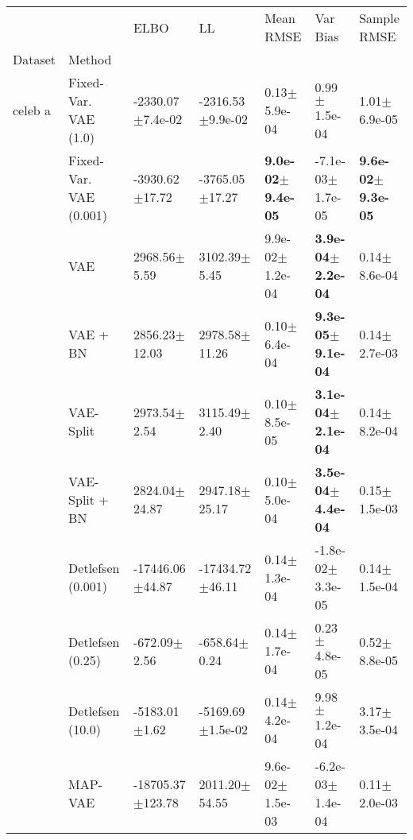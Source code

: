 \begin{tabular}{lllllll}
\toprule
      &            &                         ELBO &                           LL &                     Mean RMSE &                       Var Bias &                   Sample RMSE \\
Dataset & Method &                              &                              &                               &                                &                               \\
\midrule
celeb a & Fixed-Var. VAE (1.0) &         -2330.07$\pm$7.4e-02 &         -2316.53$\pm$9.9e-02 &              0.13$\pm$5.9e-04 &               0.99$\pm$1.5e-04 &              1.01$\pm$6.9e-05 \\
      & Fixed-Var. VAE (0.001) &           -3930.62$\pm$17.72 &           -3765.05$\pm$17.27 &  \textbf{9.0e-02$\pm$9.4e-05} &           -7.1e-03$\pm$1.7e-05 &  \textbf{9.6e-02$\pm$9.3e-05} \\
      & VAE &             2968.56$\pm$5.59 &             3102.39$\pm$5.45 &           9.9e-02$\pm$1.2e-04 &   \textbf{3.9e-04$\pm$2.2e-04} &              0.14$\pm$8.6e-04 \\
      & VAE + BN &            2856.23$\pm$12.03 &            2978.58$\pm$11.26 &              0.10$\pm$6.4e-04 &   \textbf{9.3e-05$\pm$9.1e-04} &              0.14$\pm$2.7e-03 \\
      & VAE-Split &             2973.54$\pm$2.54 &             3115.49$\pm$2.40 &              0.10$\pm$8.5e-05 &   \textbf{3.1e-04$\pm$2.1e-04} &              0.14$\pm$8.2e-04 \\
      & VAE-Split + BN &            2824.04$\pm$24.87 &            2947.18$\pm$25.17 &              0.10$\pm$5.0e-04 &   \textbf{3.5e-04$\pm$4.4e-04} &              0.15$\pm$1.5e-03 \\
      & Detlefsen (0.001) &          -17446.06$\pm$44.87 &          -17434.72$\pm$46.11 &              0.14$\pm$1.3e-04 &           -1.8e-02$\pm$3.3e-05 &              0.14$\pm$1.5e-04 \\
      & Detlefsen (0.25) &             -672.09$\pm$2.56 &             -658.64$\pm$0.24 &              0.14$\pm$1.7e-04 &               0.23$\pm$4.8e-05 &              0.52$\pm$8.8e-05 \\
      & Detlefsen (10.0) &            -5183.01$\pm$1.62 &         -5169.69$\pm$1.5e-02 &              0.14$\pm$4.2e-04 &               9.98$\pm$1.2e-04 &              3.17$\pm$3.5e-04 \\
      & MAP-VAE &         -18705.37$\pm$123.78 &            2011.20$\pm$54.55 &           9.6e-02$\pm$1.5e-03 &           -6.2e-03$\pm$1.4e-04 &              0.11$\pm$2.0e-03 \\

\end{tabular}

